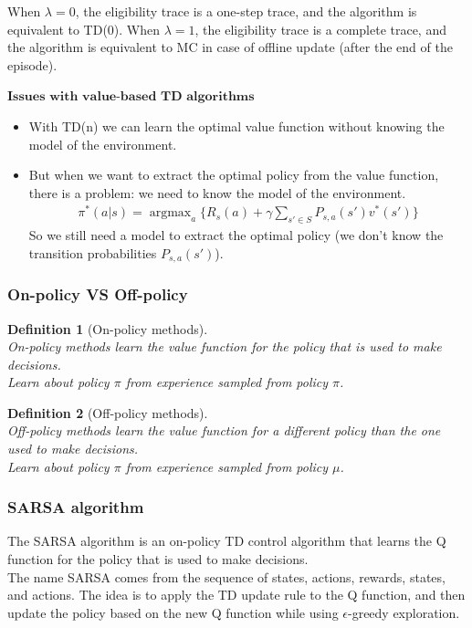 \documentclass[11pt]{book} %
\DeclareMathOperator*{\argmax}{argmax}
\newtheorem{definition}{Definition}[section]
\begin{document}
When $\lambda = 0$, the eligibility trace is a one-step trace, and the algorithm is equivalent to TD(0).
When $\lambda = 1$, the eligibility trace is a complete trace, and the algorithm is equivalent to MC in case of offline update (after the end of the episode).

\medbreak
$\textbf{Issues with value-based TD algorithms}$ \\
\begin{itemize}
    \item With TD(n) we can learn the optimal value function without knowing the model of the environment.
    \item But when we want to extract the optimal policy from the value function, there is a problem: we need to know the model of the environment.
    \begin{align*}
        \pi^*(a|s) = \argmax_{a} \{R_s(a) + \gamma \sum_{s' \in S} P_{s,a}(s') v^*(s') \}
    \end{align*}
    So we still need a model to extract the optimal policy (we don't know the transition probabilities $P_{s,a}(s')$).
\end{itemize}


\subsubsection{On-policy VS Off-policy}
\begin{definition}[On-policy methods]\ \\
    On-policy methods learn the value function for the policy that is used to make decisions. \\
    Learn about policy $\pi$ from experience sampled from policy $\pi$.
\end{definition}
\begin{definition}[Off-policy methods]\ \\
    Off-policy methods learn the value function for a different policy than the one used to make decisions. \\
    Learn about policy $\pi$ from experience sampled from policy $\mu$.
\end{definition}


\subsubsection{SARSA algorithm}
The SARSA algorithm is an on-policy TD control algorithm that learns the Q function for the policy that is used to make decisions. \\
The name SARSA comes from the sequence of states, actions, rewards, states, and actions. 
The idea is to apply the TD update rule to the Q function, and then update the policy based on the new Q function while using $\epsilon$-greedy exploration.
\end{document}

